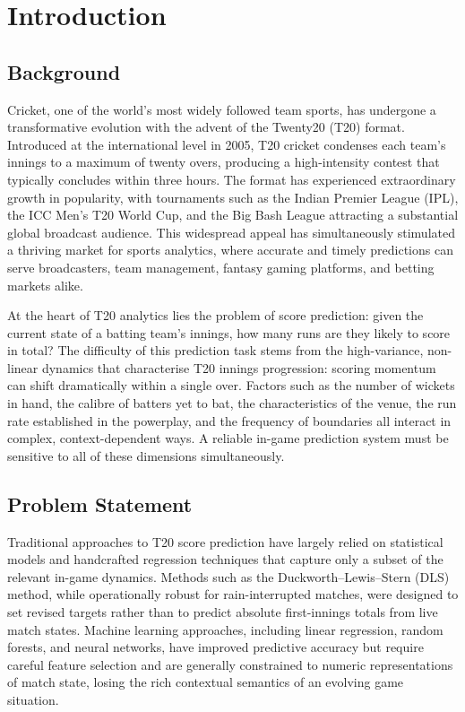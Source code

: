 \chapter{Introduction}
\setcounter{page}{1}

\section{Background}

Cricket, one of the world's most widely followed team sports, has undergone a transformative evolution with the advent of the Twenty20 (T20) format. Introduced at the international level in 2005, T20 cricket condenses each team's innings to a maximum of twenty overs, producing a high-intensity contest that typically concludes within three hours. The format has experienced extraordinary growth in popularity, with tournaments such as the Indian Premier League (IPL), the ICC Men's T20 World Cup, and the Big Bash League attracting a substantial global broadcast audience. This widespread appeal has simultaneously stimulated a thriving market for sports analytics, where accurate and timely predictions can serve broadcasters, team management, fantasy gaming platforms, and betting markets alike.

At the heart of T20 analytics lies the problem of score prediction: given the current state of a batting team's innings, how many runs are they likely to score in total? The difficulty of this prediction task stems from the high-variance, non-linear dynamics that characterise T20 innings progression: scoring momentum can shift dramatically within a single over. Factors such as the number of wickets in hand, the calibre of batters yet to bat, the characteristics of the venue, the run rate established in the powerplay, and the frequency of boundaries all interact in complex, context-dependent ways. A reliable in-game prediction system must be sensitive to all of these dimensions simultaneously.

\section{Problem Statement}

Traditional approaches to T20 score prediction have largely relied on statistical models and handcrafted regression techniques that capture only a subset of the relevant in-game dynamics. Methods such as the Duckworth--Lewis--Stern (DLS) method, while operationally robust for rain-interrupted matches, were designed to set revised targets rather than to predict absolute first-innings totals from live match states. Machine learning approaches, including linear regression, random forests, and neural networks, have improved predictive accuracy but require careful feature selection and are generally constrained to numeric representations of match state, losing the rich contextual semantics of an evolving game situation.

